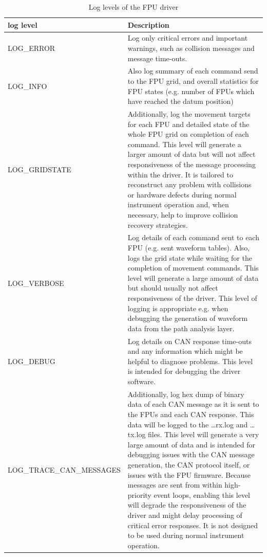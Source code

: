 \documentclass[11pt,a4paper]{scrartcl}
\begin{document}
\begin{table}
  \begin{centering}
\begin{tabular}{|l|p{}|}
  \hline
  \textbf{log level} & \textbf{Description} \\
  \hline
    LOG\_ERROR & 
    Log only critical errors and important warnings, such as collision
    messages and message time-outs. \\

    \hline
    LOG\_INFO & 
    Also log summary of each command send to the FPU grid, and
    overall statistics for FPU states (e.g. number of FPUs which
    have reached the datum position) \\

    \hline
    LOG\_GRIDSTATE &
    Additionally, log the movement targets for each
    FPU and detailed state of the whole FPU grid on completion of each
    command.  This level will generate a larger amount of data but
    will not affect responsiveness of the message processing within
    the driver.  It is tailored to reconstruct any problem with
    collisions or hardware defects during normal instrument operation
    and, when necessary, help to improve collision recovery
    strategies. \\

    \hline
    LOG\_VERBOSE &

    Log details of each command sent to each FPU
    (e.g. sent waveform tables). Also, logs the grid state while
    waiting for the completion of movement commands. This level will
    generate a large amount of data but should usually not affect
    responsiveness of the driver. This level of logging is appropriate
    e.g. when debugging the generation of waveform data from the path
    analysis layer. \\

    \hline
    LOG\_DEBUG &
    Log details on CAN response time-outs and any information which
    might be helpful to diagnose problems. This level is intended
    for debugging the driver software.\\

    \hline LOG\_TRACE\_CAN\_MESSAGES & Additionally, log hex dump of
    binary data of each CAN message as it is sent to the FPUs and each
    CAN response. This data will be logged to the \ldots{}rx.log and
    \ldots{}tx.log files. This level will generate a very large amount
    of data and is intended for debugging issues with the CAN message
    generation, the CAN protocol itself, or issues with the FPU
    firmware. Because messages are sent from within high-priority
    event loops, enabling this level will degrade the responsiveness
    of the driver and might delay processing of critical error
    responses. It is not designed to be used during normal instrument
    operation. \\
 
  
  \hline
\end{tabular}
\end{centering}
\caption{Log levels of the FPU driver}
\label{tab:loglevels}
\end{table}
\end{document}
